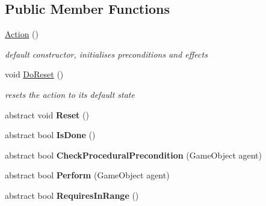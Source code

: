 \subsection*{Public Member Functions}
\begin{DoxyCompactItemize}
\item 
\hyperlink{class_action_aed886910937b93b956b61cff7be572bc}{Action} ()
\begin{DoxyCompactList}\small\item\em default constructor, initialises preconditions and effects \end{DoxyCompactList}\item 
void \hyperlink{class_action_a21740ddc42a7c47572caede717005763}{Do\+Reset} ()
\begin{DoxyCompactList}\small\item\em resets the action to its default state \end{DoxyCompactList}\item 
\hypertarget{class_action_ac1fbcc1054f462ea4e46aecec983e8ec}{}abstract void {\bfseries Reset} ()\label{class_action_ac1fbcc1054f462ea4e46aecec983e8ec}

\item 
\hypertarget{class_action_ada6d09848fa150cc89745fff1bc8b2d5}{}abstract bool {\bfseries Is\+Done} ()\label{class_action_ada6d09848fa150cc89745fff1bc8b2d5}

\item 
\hypertarget{class_action_a43360ddabf1415318e453fcaf9805c8d}{}abstract bool {\bfseries Check\+Procedural\+Precondition} (Game\+Object agent)\label{class_action_a43360ddabf1415318e453fcaf9805c8d}

\item 
\hypertarget{class_action_af779fa1eb5494513e7afe3450362f23e}{}abstract bool {\bfseries Perform} (Game\+Object agent)\label{class_action_af779fa1eb5494513e7afe3450362f23e}

\item 
\hypertarget{class_action_ac2df69ba49c45fc4fbd9f76e7c3beb56}{}abstract bool {\bfseries Requires\+In\+Range} ()\label{class_action_ac2df69ba49c45fc4fbd9f76e7c3beb56}


\end{DoxyCompactItemize}
